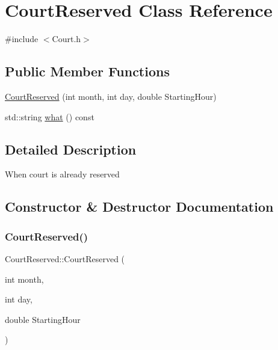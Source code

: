 \hypertarget{class_court_reserved}{}\section{Court\+Reserved Class Reference}
\label{class_court_reserved}


{\ttfamily \#include $<$Court.\+h$>$}

\subsection*{Public Member Functions}
\begin{DoxyCompactItemize}
\item 
\mbox{\hyperlink{class_court_reserved_a841e91cf714463cf47a20be9b8d32752}{Court\+Reserved}} (int month, int day, double Starting\+Hour)
\item 
std\+::string \mbox{\hyperlink{class_court_reserved_a3f86a29ee125b95d68c4ee9ea6163e4e}{what}} () const
\end{DoxyCompactItemize}


\subsection{Detailed Description}
When court is already reserved 

\subsection{Constructor \& Destructor Documentation}
\mbox{\label{class_court_reserved_a841e91cf714463cf47a20be9b8d32752}} 
\subsubsection{\texorpdfstring{Court\+Reserved()}{CourtReserved()}}
{\footnotesize\ttfamily Court\+Reserved\+::\+Court\+Reserved (\begin{DoxyParamCaption}\item[{int}]{month,  }\item[{int}]{day,  }\item[{double}]{Starting\+Hour }\end{DoxyParamCaption})}



